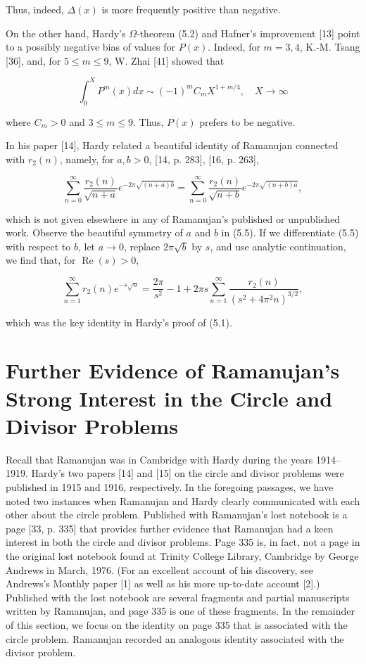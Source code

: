\documentclass[10pt]{article}
\theoremstyle{plain}
\begin{document}
Thus, indeed, $\Delta(x)$ is more frequently positive than negative.

On the other hand, Hardy's $\Omega$-theorem (5.2) and Hafner's improvement [13] point to a possibly negative bias of values for $P(x)$. Indeed, for $m=3,4$, K.-M. Tsang [36], and, for $5 \leq m \leq 9$, W. Zhai [41] showed that

$$
\int_{0}^{X} P^{m}(x) d x \sim(-1)^{m} C_{m} X^{1+m / 4}, \quad X \to \infty
$$

where $C_{m}>0$ and $3 \leq m \leq 9$. Thus, $P(x)$ prefers to be negative.

In his paper [14], Hardy related a beautiful identity of Ramanujan connected with $r_{2}(n)$, namely, for $a, b>0$, [14, p. 283], [16, p. 263],


\begin{equation*}
\sum_{n=0}^{\infty} \frac{r_{2}(n)}{\sqrt{n+a}} e^{-2 \pi \sqrt{(n+a) b}}=\sum_{n=0}^{\infty} \frac{r_{2}(n)}{\sqrt{n+b}} e^{-2 \pi \sqrt{(n+b) a}}, \tag{5.5}
\end{equation*}


which is not given elsewhere in any of Ramanujan's published or unpublished work. Observe the beautiful symmetry of $a$ and $b$ in (5.5). If we differentiate (5.5) with respect to $b$, let $a \to 0$, replace $2 \pi \sqrt{b}$ by $s$, and use analytic continuation, we find that, for $\operatorname{Re}(s)>0$,

$$
\sum_{n=1}^{\infty} r_{2}(n) e^{-s \sqrt{n}}=\frac{2 \pi}{s^{2}}-1+2 \pi s \sum_{n=1}^{\infty} \frac{r_{2}(n)}{\left(s^{2}+4 \pi^{2} n\right)^{3 / 2}},
$$

which was the key identity in Hardy's proof of (5.1).

\section{Further Evidence of Ramanujan's Strong Interest in the Circle and Divisor Problems}

Recall that Ramanujan was in Cambridge with Hardy during the years 1914--1919. Hardy's two papers [14] and [15] on the circle and divisor problems were published in 1915 and 1916, respectively. In the foregoing passages, we have noted two instances when Ramanujan and Hardy clearly communicated with each other about the circle problem. Published with Ramanujan's lost notebook is a page [33, p. 335] that provides further evidence that Ramanujan had a keen interest in both the circle and divisor problems. Page 335 is, in fact, not a page in the original lost notebook found at Trinity College Library, Cambridge by George Andrews in March, 1976. (For an excellent account of his discovery, see Andrews's Monthly paper [1] as well as his more up-to-date account [2].) Published with the lost notebook are several fragments and partial manuscripts written by Ramanujan, and page 335 is one of these fragments. In the remainder of this section, we focus on the identity on page 335 that is associated with the circle problem. Ramanujan recorded an analogous identity associated with the divisor problem.
\end{document}
